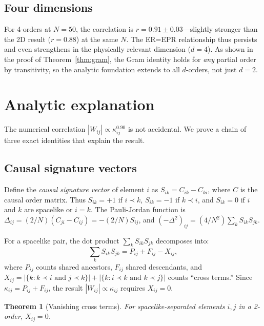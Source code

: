 \documentclass[aps,prd,twocolumn,superscriptaddress,nofootinbib]{revtex4-2}
\newtheorem{theorem}{Theorem}
\begin{document}
\subsection{Four dimensions}

For 4-orders at $N = 50$, the correlation is $r = 0.91 \pm 0.03$---slightly stronger than the 2D result ($r = 0.88$) at the same $N$. The ER=EPR relationship thus persists and even strengthens in the physically relevant dimension ($d = 4$). As shown in the proof of Theorem~\ref{thm:gram}, the Gram identity holds for \emph{any} partial order by transitivity, so the analytic foundation extends to all $d$-orders, not just $d = 2$.

\section{Analytic explanation}

The numerical correlation $|W_{ij}| \propto \kappa_{ij}^{0.90}$ is not accidental. We prove a chain of three exact identities that explain the result.

\subsection{Causal signature vectors}

Define the \emph{causal signature vector} of element $i$ as $S_{ik} = C_{ik} - C_{ki}$, where $C$ is the causal order matrix. Thus $S_{ik} = +1$ if $i \prec k$, $S_{ik} = -1$ if $k \prec i$, and $S_{ik} = 0$ if $i$ and $k$ are spacelike or $i = k$. The Pauli-Jordan function is $\Delta_{ij} = (2/N)(C_{ji} - C_{ij}) = -(2/N) S_{ij}$, and $(-\Delta^2)_{ij} = (4/N^2) \sum_k S_{ik} S_{jk}$.

For a spacelike pair, the dot product $\sum_k S_{ik} S_{jk}$ decomposes into:
\begin{equation}
\sum_k S_{ik} S_{jk} = P_{ij} + F_{ij} - X_{ij},
\end{equation}
where $P_{ij}$ counts shared ancestors, $F_{ij}$ shared descendants, and $X_{ij} = |\{k : k \prec i \text{ and } j \prec k\}| + |\{k : i \prec k \text{ and } k \prec j\}|$ counts ``cross terms.'' Since $\kappa_{ij} = P_{ij} + F_{ij}$, the result $|W_{ij}| \propto \kappa_{ij}$ requires $X_{ij} = 0$.

\begin{theorem}[Vanishing cross terms]
\label{thm:cross}
For spacelike-separated elements $i, j$ in a 2-order, $X_{ij} = 0$.
\end{theorem}
\end{document}
